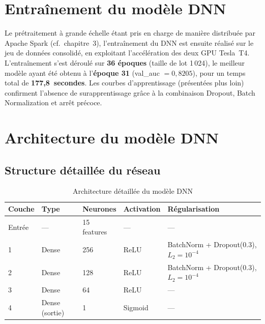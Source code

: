 \documentclass[12pt,a4paper]{report}
\begin{document}
\section{Entraînement du modèle DNN}

Le prétraitement à grande échelle étant pris en charge de manière distribuée par
Apache Spark (cf.\ chapitre~3), l'entraînement du \acs{DNN} est ensuite réalisé sur
le jeu de données consolidé, en exploitant l'accélération des deux \acs{GPU}
Tesla~T4. L'entraînement s'est déroulé sur \textbf{36 époques} (taille de lot
1\,024), le meilleur modèle ayant été obtenu à l'\textbf{époque 31}
(val\_auc $= 0{,}8205$), pour un temps total de \textbf{177,8~secondes}. Les
courbes d'apprentissage (présentées plus loin) confirment l'absence de
surapprentissage grâce à la combinaison Dropout, Batch Normalization et arrêt
précoce.

\section{Architecture du modèle DNN}

\subsection{Structure détaillée du réseau}

\begin{table}[H]
\centering
\caption{Architecture détaillée du modèle DNN}
\label{tab:dnn_arch}
\begin{tabularx}{\textwidth}{C{2cm} L{3cm} C{2.5cm} C{2cm} X}
\toprule
\textbf{Couche} & \textbf{Type} & \textbf{Neurones} & \textbf{Activation} & \textbf{Régularisation} \\
\midrule
Entrée & --- & 15 features & --- & --- \\
1 & Dense          & 256    & ReLU    & BatchNorm + Dropout(0.3), $L_2 = 10^{-4}$ \\
2 & Dense          & 128    & ReLU    & BatchNorm + Dropout(0.3), $L_2 = 10^{-4}$ \\
3 & Dense          & 64     & ReLU    & --- \\
4 & Dense (sortie) & 1      & Sigmoid & --- \\
\bottomrule
\end{tabularx}
\end{table}
\end{document}
